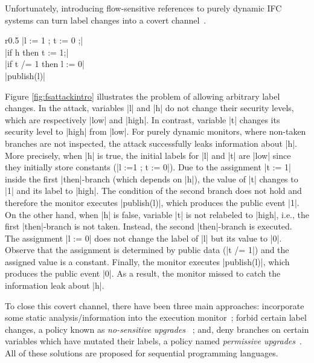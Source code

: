 Unfortunately, introducing flow-sensitive references to purely dynamic IFC
systems can turn label changes into a covert channel~\cite{Russo:2010}. 
\begin{wrapfigure}{r}{0.5\columnwidth}
|l := 1 ; t := 0 ;| \\
|if h then t := 1;| \\
|if t /= 1 then l := 0| \\
|publish(l)| 
\caption{\small\label{fig:fsattackintro} Flow-sensitive attack}
\end{wrapfigure}
Figure \ref{fig:fsattackintro} illustrates the problem of allowing arbitrary
label changes.  In the attack, variables |l| and |h| do not change their
security levels, which are respectively |low| and |high|. In contrast, variable |t|
changes its security level to |high| from |low|. For purely dynamic monitors, where
non-taken branches are not inspected, the attack successfully leaks information
about |h|. More precisely, when |h| is true, the initial labels for |l| and |t|
are |low| since they initially store constants (|l :=1 ; t := 0|).  Due to 
the assignment |t := 1| inside the
first |then|-branch (which depends on |h|), the value of |t| changes to |1| and its label to
|high|. The condition of the second branch does not hold and therefore 
the monitor executes |publish(l)|, which produces the public event 
|1|. On the other hand, when |h| is false, variable |t| is not relabeled to 
|high|, i.e., the first |then|-branch is not taken. Instead, the second
|then|-branch is executed. 
The assignment |l := 0| does not change the label of |l| but its value to 
 |0|. Observe that the assignment is determined by public data (|t /= 1|)
and the assigned value is a constant. Finally, the monitor executes
|publish(l)|, which produces the public event |0|. As a result, the monitor 
missed to catch the information leak about |h|.  

To close this covert channel, there have been three main approaches:
incorporate some static analysis/information into the execution
monitor~\cite{Russo:2010,stefan:lio,10.1109/SP.2013.10}; forbid certain label
changes, a policy known as \emph{no-sensitive
  upgrades}~%
; and, deny branches on certain
variables which have mutated their labels, a policy named \emph{permissive
  upgrades}~\cite{Austin:Flanagan:PLAS10}. All of these solutions are proposed
for sequential programming languages.


